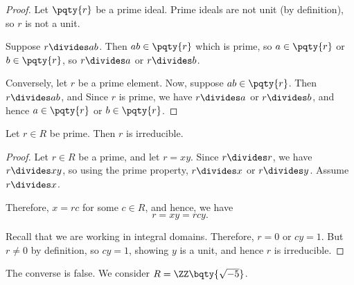 \begin{proof}
    Let \(\pqty{r}\) be a prime ideal. Prime ideals are not unit (by definition), so \(r\) is not a unit.

    Suppose \(r \divides ab\). Then \(ab \in \pqty{r}\) which is prime, so \(a \in \pqty{r}\) or \(b \in \pqty{r}\), so \(r \divides a\) or \(r \divides b\).

    Conversely, let \(r\) be a prime element. Now, suppose \(ab \in \pqty{r}\). Then \(r \divides ab\), and     Since \(r\) is prime, we have \(r \divides a\) or \(r \divides b\), and hence \(a \in \pqty{r}\) or \(b \in \pqty{r}\).
\end{proof}

\begin{proposition}
    \label{prop:primes-are-irreducible}%
    Let \(r \in R\) be prime. Then \(r\) is irreducible.
\end{proposition}

\begin{proof}
    Let \(r \in R\) be a prime, and let \(r = xy\). Since \(r \divides r\), we have \(r \divides xy\), so using the prime property, \(r \divides x\) or \(r \divides y\). Assume \(r \divides x\).

    Therefore, \(x = rc\) for some \(c \in R\), and hence, we have
    \[
        r = xy = rcy.
    \]

    Recall that we are working in integral domains. Therefore, \(r = 0\) or \(cy = 1\). But \(r \neq 0\) by definition, so \(cy = 1\), showing \(y\) is a unit, and hence \(r\) is irreducible.
\end{proof}

The converse is false. We consider \(R = \ZZ\bqty{\sqrt{-5}}\).

